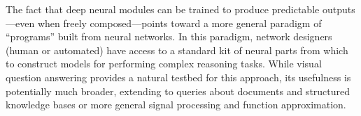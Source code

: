 \documentclass[10pt,twocolumn,letterpaper]{article}
\begin{document}
The fact that deep neural modules can be trained to produce predictable
outputs---even when freely composed---points toward a more general paradigm of
``programs'' built from neural networks. In this paradigm, network designers
(human or automated) have access to a standard kit of neural parts from which to
construct models for performing complex reasoning tasks. While visual question
answering provides a natural testbed for this approach, its usefulness is
potentially much broader, extending to queries about documents and structured
knowledge bases or more general signal processing and function approximation.

\small


\end{document}
